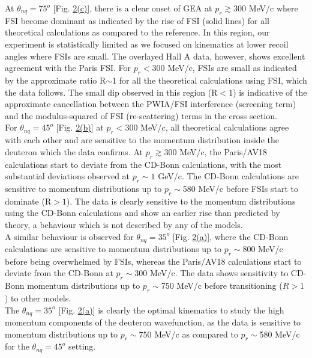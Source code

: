 \indent At $\theta_{nq}=75^{o}$ [Fig. \hyperref[fig:fig2]{2(c)}], there is a clear onset of GEA at $p_{r}\gtrsim300$ MeV/c where FSI become dominant as indicated by the rise of FSI (solid lines) for
all theoretical calculations as compared to the reference. In this region, our experiment is statistically limited as we focused on kinematics at lower recoil angles where FSIs are small. The overlayed
Hall A data, however, shows excellent agreement with the Paris FSI. For $p_{r}<300$ MeV/c, FSIs are small as indicated by the approximate ratio R$\sim$1 for all the theoretical calculations using FSI, which the data follows. The
small dip observed in this region (R$<1$) is indicative of the approximate cancellation between the PWIA/FSI interference (screening term) and the modulus-squared of FSI (re-scattering) terms in the cross section. \\
\indent For $\theta_{nq}=45^{o}$ [Fig. \hyperref[fig:fig2]{2(b)}] at $p_{r}<300$ MeV/c, all theoretical calculations agree with each other and are sensitive to the momentum distribution inside the deuteron which
the data confirms. At $p_{r}\gtrsim300$ MeV/c, the Paris/AV18 calculations start to deviate from the CD-Bonn calculations, with the most substantial deviations observed at $p_{r}\sim 1$ GeV/c.
The CD-Bonn calculations are sensitive to momentum distributions up to $p_{r}\sim$580 MeV/c before FSIs start to dominate (R$>1$).
The data is clearly sensitive to the momentum distributions using the CD-Bonn calculations and show an earlier rise than predicted by theory, a behaviour which is not described by any of the models. \\
\indent A similar behaviour is observed for $\theta_{nq}=35^{o}$ [Fig. \hyperref[fig:fig2]{2(a)}], where the CD-Bonn calculations are sensitive to momentum distributions up to $p_{r}\sim800$ MeV/c before being
overwhelmed by FSIs, whereas the Paris/AV18 calculations start to deviate from the CD-Bonn at $p_{r}\sim300$ MeV/c. The data shows sensitivity to CD-Bonn momentum distributions up to $p_{r}\sim$750 MeV/c before
transitioning ($R>1$) to other models. \\ 
\indent The $\theta_{nq}=35^{o}$ [Fig. \hyperref[fig:fig2]{2(a)}] is clearly the optimal kinematics to study the high momentum components of the deuteron wavefunction, as the data is sensitive to momentum
distributions up to $p_{r}\sim750$ MeV/c as compared to $p_{r}\sim$580 MeV/c for the $\theta_{nq}=45^{o}$ setting. \\
